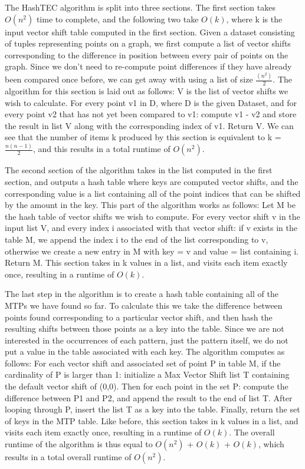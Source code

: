 \documentclass[12pt]{article}
\begin{document}
The HashTEC algorithm is split into three sections. The first section takes $O(n^2)$ time to complete, and the following two take $O(k)$, where k is the input vector shift table computed in the first section. Given a dataset consisting of tuples representing points on a graph, we first compute a list of vector shifts corresponding to the difference in position between every pair of points on the graph. Since we don't need to re-compute point differences if they have already been compared once before, we can get away with using a list of size $\frac{(n^2)}{2}$. The algorithm for this section is laid out as follows: 
V is the list of vector shifts we wish to calculate. For every point v1 in D, where D is the given Dataset, and for every point v2 that has not yet been compared to v1:  compute v1 - v2 and store the result in list V along with the corresponding index of v1. Return V. We can see that the number of items k produced by this section is equivalent to k = $\frac{n(n-1)}{2}$, and this results in a total runtime of $O(n^2)$.

The second section of the algorithm takes in the list computed in the first section, and outputs a hash table where keys are computed vector shifts, and the corresponding value is a list containing all of the point indices that can be shifted by the amount in the key. This part of the algorithm works as follows: Let M be the hash table of vector shifts we wish to compute. For every vector shift v in the input list V, and every index i associated with that vector shift: if v exists in the table M, we append the index i to the end of the list corresponding to v, otherwise we create a new entry in M with key = v and value = list containing i. Return M. This section takes in k values in a list, and visits each item exactly once, resulting in a runtime of $O(k)$.

The last step in the algorithm is to create a hash table containing all of the MTPs we have found so far. To calculate this we take the difference between points found corresponding to a particular vector shift, and then hash the resulting shifts between those points as a key into the table. Since we are not interested in the occurrences of each pattern, just the pattern itself, we do not put a value in the table associated with each key. The algorithm computes as follows: For each vector shift and associated set of point P in table M, if the cardinality of P is larger than 1: initialize a Max Vector Shift list T containing the default vector shift of (0,0). Then for each point in the set P: compute the difference between P1 and P2, and append the result to the end of list T. After looping through P, insert the list T as a key into the table. Finally, return the set of keys in the MTP table. Like before, this section takes in k values in a list, and visits each item exactly once, resulting in a runtime of $O(k)$. The overall runtime of the algorithm is thus equal to $O(n^2)$ + $O(k)$ + $O(k)$, which results in a total overall runtime of $O(n^2)$.
\end{document}
